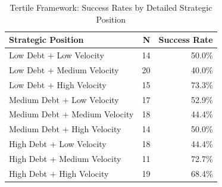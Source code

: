 \begin{table}[htbp]
\centering
\caption{Tertile Framework: Success Rates by Detailed Strategic Position}
\label{app:tertile_analysis}
\begin{tabular}{lrr}
\hline
\textbf{Strategic Position} & \textbf{N} & \textbf{Success Rate} \\
\hline
Low Debt + Low Velocity & 14 & 50.0\% \\
Low Debt + Medium Velocity & 20 & 40.0\% \\
Low Debt + High Velocity & 15 & 73.3\% \\
\hline
Medium Debt + Low Velocity & 17 & 52.9\% \\
Medium Debt + Medium Velocity & 18 & 44.4\% \\
Medium Debt + High Velocity & 14 & 50.0\% \\
\hline
High Debt + Low Velocity & 18 & 44.4\% \\
High Debt + Medium Velocity & 11 & 72.7\% \\
High Debt + High Velocity & 19 & 68.4\% \\
\hline
\end{tabular}
\end{table}


